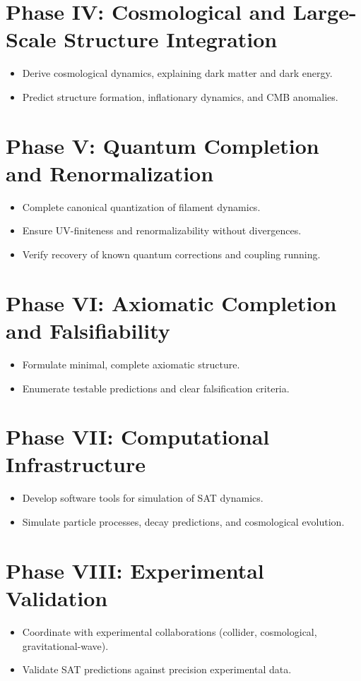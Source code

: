 \documentclass{article}
\begin{document}
\section{Phase IV: Cosmological and Large-Scale Structure Integration}
\begin{itemize}
    \item Derive cosmological dynamics, explaining dark matter and dark energy.
    \item Predict structure formation, inflationary dynamics, and CMB anomalies.
\end{itemize}

\section{Phase V: Quantum Completion and Renormalization}
\begin{itemize}
    \item Complete canonical quantization of filament dynamics.
    \item Ensure UV-finiteness and renormalizability without divergences.
    \item Verify recovery of known quantum corrections and coupling running.
\end{itemize}

\section{Phase VI: Axiomatic Completion and Falsifiability}
\begin{itemize}
    \item Formulate minimal, complete axiomatic structure.
    \item Enumerate testable predictions and clear falsification criteria.
\end{itemize}

\section{Phase VII: Computational Infrastructure}
\begin{itemize}
    \item Develop software tools for simulation of SAT dynamics.
    \item Simulate particle processes, decay predictions, and cosmological evolution.
\end{itemize}

\section{Phase VIII: Experimental Validation}
\begin{itemize}
    \item Coordinate with experimental collaborations (collider, cosmological, gravitational-wave).
    \item Validate SAT predictions against precision experimental data.
\end{itemize}
\end{document}
